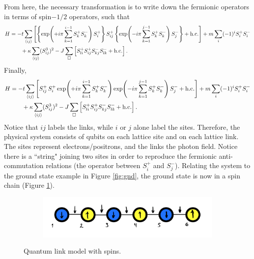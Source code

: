 \documentclass[a4paper]{report}
\begin{document}
\begin{spacing}{1.1}
\begin{appendices}
From here, the necessary transformation is to write down the fermionic operators in terms of spin$-1/2$ operators, such that
\begin{align}
    H &= -t \sum_{\expval{ij}} \left[ \left\{\exp(+i\pi \sum_{k=1}^{i-1} S_k^+S_k^-) \, S_i^+\right\} S^+_{ij} \left\{\exp(-i\pi \sum_{k=1}^{j-1} S_k^+S_k^-) \, S_j^- \right\} + \textnormal{h.c.} \right] + m \sum_i (-1)^i S^+_i S^-_i \\
    &\qquad + \kappa \sum_{\expval{ij}} (S^3_{ij})^2 -J \sum_\square \left[ S^+_{li} S^+_{ij} S^-_{kj} S^-_{lk} + \textnormal{h.c.}\right].
\end{align}
Finally,
\begin{align}
    H &= -t \sum_{\expval{ij}} \left[ S^+_{ij} \, S_i^+ \exp(+i\pi \sum_{k=1}^{i-1} S_k^+S_k^-)  \exp(-i\pi \sum_{k=1}^{j-1} S_k^+S_k^-) \, S_j^- + \textnormal{h.c.} \right] + m \sum_i (-1)^i S^+_i S^-_i \\
    &\qquad + \kappa \sum_{\expval{ij}} (S^3_{ij})^2 -J \sum_\square \left[ S^+_{li} S^+_{ij} S^-_{kj} S^-_{lk} + \textnormal{h.c.}\right].
\end{align}
Notice that $ij$ labels the links, while $i$ or $j$ alone label the sites. Therefore, the physical system consists of qubits on each lattice site and on each lattice link. The sites represent electrons/positrons, and the links the photon field. Notice there is a ``string" joining two sites in order to reproduce the fermionic anti-commutation relations (the operator between $S_i^+$ and $S_j^-$). Relating the system to the ground state example in Figure \ref{fig:gnd}, the ground state is now in a spin chain (Figure \ref{fig:spins}).

\begin{figure}[h!]
\centering
\begin{subfigure}{0.4\textwidth}
\includegraphics[width=\linewidth]{spins.png} %
\end{subfigure}
\caption{Quantum link model with spins.\label{fig:spins}}
\end{figure}







\end{appendices}



\end{spacing}
\end{document}
